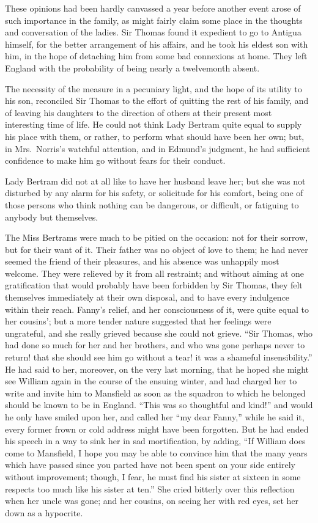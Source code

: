 \documentclass{article}
\begin{document}
These opinions had been hardly canvassed a year before
another event arose of such importance in the family,
as might fairly claim some place in the thoughts and
conversation of the ladies.  Sir Thomas found it expedient
to go to Antigua himself, for the better arrangement
of his affairs, and he took his eldest son with him,
in the hope of detaching him from some bad connexions
at home.  They left England with the probability of being
nearly a twelvemonth absent.

The necessity of the measure in a pecuniary light,
and the hope of its utility to his son, reconciled Sir
Thomas to the effort of quitting the rest of his family,
and of leaving his daughters to the direction of others
at their present most interesting time of life.
He could not think Lady Bertram quite equal to supply his
place with them, or rather, to perform what should have
been her own; but, in Mrs.\ Norris's watchful attention,
and in Edmund's judgment, he had sufficient confidence
to make him go without fears for their conduct.

Lady Bertram did not at all like to have her husband leave her;
but she was not disturbed by any alarm for his safety,
or solicitude for his comfort, being one of those persons
who think nothing can be dangerous, or difficult,
or fatiguing to anybody but themselves.

The Miss Bertrams were much to be pitied on the occasion:
not for their sorrow, but for their want of it.
Their father was no object of love to them; he had never
seemed the friend of their pleasures, and his absence
was unhappily most welcome.  They were relieved by it from
all restraint; and without aiming at one gratification
that would probably have been forbidden by Sir Thomas,
they felt themselves immediately at their own disposal,
and to have every indulgence within their reach.
Fanny's relief, and her consciousness of it, were quite
equal to her cousins'; but a more tender nature suggested
that her feelings were ungrateful, and she really
grieved because she could not grieve.  ``Sir Thomas,
who had done so much for her and her brothers, and who was
gone perhaps never to return! that she should see him
go without a tear! it was a shameful insensibility.''
He had said to her, moreover, on the very last morning,
that he hoped she might see William again in the course
of the ensuing winter, and had charged her to write
and invite him to Mansfield as soon as the squadron
to which he belonged should be known to be in England.
``This was so thoughtful and kind!'' and would he only
have smiled upon her, and called her ``my dear Fanny,''
while he said it, every former frown or cold address
might have been forgotten.  But he had ended his speech
in a way to sink her in sad mortification, by adding,
``If William does come to Mansfield, I hope you may be able
to convince him that the many years which have passed
since you parted have not been spent on your side entirely
without improvement; though, I fear, he must find his sister
at sixteen in some respects too much like his sister at ten.''
She cried bitterly over this reflection when her uncle
was gone; and her cousins, on seeing her with red eyes,
set her down as a hypocrite.
\end{document}
